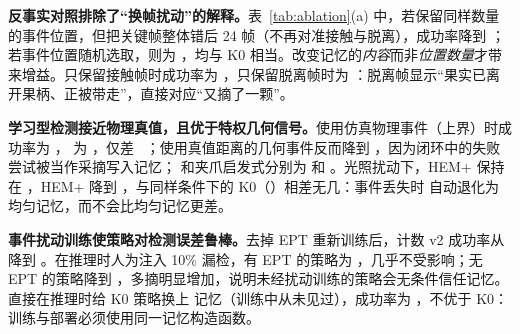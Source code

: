 \textbf{反事实对照排除了“换帧扰动”的解释。}表~\ref{tab:ablation}(a) 中，若保留同样数量的事件位置，但把关键帧整体错后 24 帧（不再对准接触与脱离），成功率降到 ；若事件位置随机选取，则为 ，均与 K0 相当。改变记忆的\emph{内容}而非\emph{位置数量}才带来增益。只保留接触帧时成功率为 ，只保留脱离帧时为 ：脱离帧显示“果实已离开果柄、正被带走”，直接对应“又摘了一颗”。

\textbf{学习型检测接近物理真值，且优于特权几何信号。}使用仿真物理事件（上界）时成功率为 ，\pedet{} 为 ，仅差 ~\pp；使用真值距离的几何事件反而降到 ，因为闭环中的失败尝试被当作采摘写入记忆；\fdm{} 和夹爪启发式分别为  和 。光照扰动下，HEM+\pedet{} 保持在 ，HEM+\fdm{} 降到 ，与同样条件下的 K0（）相差无几：事件丢失时 \hem{} 自动退化为均匀记忆，而不会比均匀记忆更差。

\textbf{事件扰动训练使策略对检测误差鲁棒。}去掉 EPT 重新训练后，计数 v2 成功率从  降到 。在推理时人为注入 10\% 漏检，有 EPT 的策略为 ，几乎不受影响；无 EPT 的策略降到 ，多摘明显增加，说明未经扰动训练的策略会无条件信任记忆。直接在推理时给 K0 策略换上 \hem{} 记忆（训练中从未见过），成功率为 ，不优于 K0：训练与部署必须使用同一记忆构造函数。


